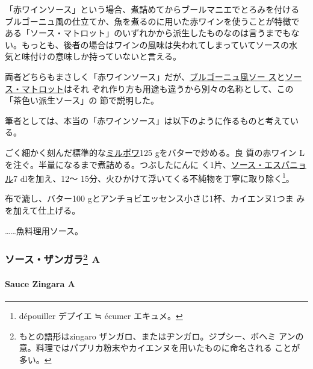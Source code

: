 \begin{recette}
「赤ワインソース」という場合、煮詰めてからブールマニエでとろみを付ける
ブルゴーニュ風の仕立てか、魚を煮るのに用いた赤ワインを使うことが特徴で
ある「ソース・マトロット」のいずれかから派生したものなのは言うまでもな
い。もっとも、後者の場合はワインの風味は失われてしまっていてソースの水
気と味付けの意味しか持っていないと言える。

両者どちらもまさしく「赤ワインソース」だが、\protect\hyperlink{sauce-bourguignonne}{ブルゴーニュ風ソー
ス}と\protect\hyperlink{sauce-matelote}{ソース・マトロット}はそれ
ぞれ作り方も用途も違うから別々の名称として、この「茶色い派生ソース」の
節で説明した。

筆者としては、本当の「赤ワインソース」は以下のように作るものと考えてい
る。

ごく細かく刻んだ標準的な\protect\hyperlink{mirepoix}{ミルポワ}125
gをバターで炒める。良 質の赤ワイン\undemi{}
Lを注ぐ。半量になるまで煮詰める。つぶしたにんに
く1片、\protect\hyperlink{sauce-espagnole}{ソース・エスパニョル}7\undemi{}
dlを加え、12〜
15分、火ひかけて浮いてくる不純物を丁寧に取り除く\footnote{dépouiller
  デプイエ ≒ écumer エキュメ。}。

布で漉し、バター100 gとアンチョビエッセンス小さじ1杯、カイエンヌ1つま
みを加えて仕上げる。

\ldots{}\ldots{}魚料理用ソース。

\maeaki

\hypertarget{ux30bdux30fcux30b9ux30b6ux30f3ux30acux30e997-a}{%
\subsubsection[ソース・ザンガラ
A]{\texorpdfstring{ソース・ザンガラ\footnote{もとの語形はzingaro
  ザンガロ、またはヂンガロ。ジプシー、ボヘミ
  アンの意。料理ではパプリカ粉末やカイエンヌを用いたものに命名される
  ことが多い。}
A}{ソース・ザンガラ A}}\label{ux30bdux30fcux30b9ux30b6ux30f3ux30acux30e997-a}}

\hypertarget{sauce-zingara-a}{%
\paragraph{Sauce Zingara A}\label{sauce-zingara-a}}



\end{recette}
